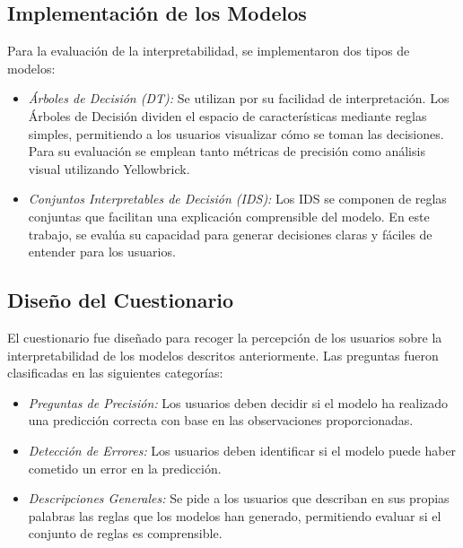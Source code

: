 \subsection{Implementación de los Modelos}
Para la evaluación de la interpretabilidad, se implementaron dos tipos de modelos:

\begin{itemize}
    \item \textit{Árboles de Decisión (DT):} Se utilizan por su facilidad de interpretación. Los Árboles de Decisión dividen el espacio de características mediante reglas simples, permitiendo a los usuarios visualizar cómo se toman las decisiones. Para su evaluación se emplean tanto métricas de precisión como análisis visual utilizando Yellowbrick.
    
    \item \textit{Conjuntos Interpretables de Decisión (IDS):} Los IDS se componen de reglas conjuntas que facilitan una explicación comprensible del modelo. En este trabajo, se evalúa su capacidad para generar decisiones claras y fáciles de entender para los usuarios.
\end{itemize}

















\subsection{Diseño del Cuestionario}
El cuestionario fue diseñado para recoger la percepción de los usuarios sobre la interpretabilidad de los modelos descritos anteriormente. Las preguntas fueron clasificadas en las siguientes categorías:

\begin{itemize}
    \item \textit{Preguntas de Precisión:} Los usuarios deben decidir si el modelo ha realizado una predicción correcta con base en las observaciones proporcionadas.
    \item \textit{Detección de Errores:} Los usuarios deben identificar si el modelo puede haber cometido un error en la predicción.
    \item \textit{Descripciones Generales:} Se pide a los usuarios que describan en sus propias palabras las reglas que los modelos han generado, permitiendo evaluar si el conjunto de reglas es comprensible.
\end{itemize}

